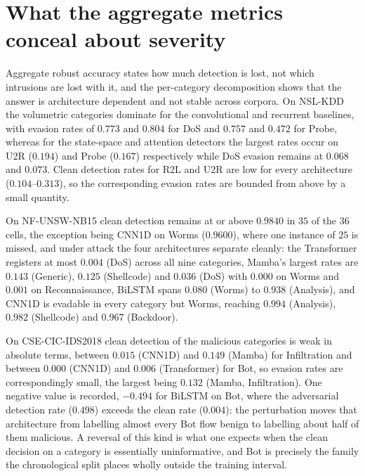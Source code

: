 \documentclass[11pt,a4paper]{article}
\begin{document}
\section{What the aggregate metrics conceal about severity}
\label{sup:severity}

Aggregate robust accuracy states how much detection is lost, not which
intrusions are lost with it, and the per-category decomposition shows
that the answer is architecture dependent and not stable across
corpora. On NSL-KDD the volumetric categories dominate for the
convolutional and recurrent baselines, with evasion rates of $0.773$
and $0.804$ for DoS and $0.757$ and $0.472$ for Probe, whereas for the
state-space and attention detectors the largest rates occur on U2R
($0.194$) and Probe ($0.167$) respectively while DoS evasion remains at
$0.068$ and $0.073$. Clean detection rates for R2L and U2R are low for
every architecture ($0.104$--$0.313$), so the corresponding evasion
rates are bounded from above by a small quantity.

On NF-UNSW-NB15 clean detection remains at or above $0.9840$ in $35$ of
the $36$ cells, the exception being CNN1D on Worms ($0.9600$), where one
instance of $25$ is missed, and under attack the four architectures
separate cleanly: the Transformer registers at most $0.004$ (DoS)
across all nine categories, Mamba's largest rates are $0.143$
(Generic), $0.125$ (Shellcode) and $0.036$ (DoS) with $0.000$ on Worms
and $0.001$ on Reconnaissance, BiLSTM spans $0.080$ (Worms) to $0.938$
(Analysis), and CNN1D is evadable in every category but Worms, reaching
$0.994$ (Analysis), $0.982$ (Shellcode) and $0.967$ (Backdoor).

On CSE-CIC-IDS2018 clean detection of the malicious categories is weak
in absolute terms, between $0.015$ (CNN1D) and $0.149$ (Mamba) for
Infiltration and between $0.000$ (CNN1D) and $0.006$ (Transformer) for
Bot, so evasion rates are correspondingly small, the largest being
$0.132$ (Mamba, Infiltration). One negative value is recorded,
$-0.494$ for BiLSTM on Bot, where the adversarial detection rate
($0.498$) exceeds the clean rate ($0.004$): the perturbation moves that
architecture from labelling almost every Bot flow benign to labelling
about half of them malicious. A reversal of this kind is what one
expects when the clean decision on a category is essentially
uninformative, and Bot is precisely the family the chronological split
places wholly outside the training interval.
\end{document}

